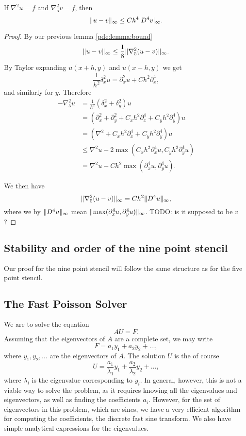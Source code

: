 \begin{theorem}
If $\nabla^2 u = f$ and $\nabla_5^2 v = f$, then
$$
\lVert u - v \rVert_\infty \leq Ch^4 \lvert D^4 v\rvert_\infty.
$$
\end{theorem}
\begin{proof}
By our previous lemma \ref{pde:lemma:bound}
$$
\lVert u - v \rVert_\infty \leq \frac18 \lVert \nabla_5^2 (u  - v) \rVert_\infty.
$$
By Taylor expanding $u(x + h, y)$ and $u(x - h, y)$ we get
$$
\frac{1}{h^2} \delta_x^2 u = \partial_x^2 u + C h^2 \partial_x^4,
$$
and similarly for $y$.
Therefore
\begin{align*}
  - \nabla_5^2 u
  &=\frac{1}{h^2} (\delta_x^2 + \delta_y^2) u\\
  &= (\partial_x^2 + \partial_y^2 + C_x h^2 \partial_x^4 + C_y h^2 \partial_y^4) u\\
  &= (\nabla^2 + C_x h^2 \partial_x^4 + C_y h^2 \partial_y^4) u\\
  &\leq \nabla^2 u + 2 \max(C_x h^2 \partial_x^4 u, C_y h^2 \partial_y^4 u)\\
  &= \nabla^2 u + C h^2 \max(\partial_x^4 u, \partial_y^4 u).
\end{align*}

We then have
$$
\lVert \nabla_5^2 (u  - v) \rVert_\infty = C h^2 \lVert D^4 u \rVert_\infty,
$$
where we by $\lVert D^4 u \rVert_\infty$ mean $\lVert \max(\partial_x^4 u, \partial_y^4 u) \rVert_\infty$. TODO: is it supposed to be $v$?
\end{proof}


\subsection{Stability and order of the nine point stencil}
Our proof for the nine point stencil will follow the same structure as for the five point stencil.



\subsection{The Fast Poisson Solver}
We are to solve the equation
$$
A U = F.
$$
Assuming that the eigenvectors of $A$ are a complete set, we may write
$$
F = a_1 y_1 + a_2 y_2 + ...,
$$
where $y_1, y_2, \dots$ are the eigenvectors of $A$.
The solution $U$ is the of course
$$
U =
\frac{a_1}{\lambda_1} y_1
+ \frac{a_2}{\lambda_2} y_2
+ \dots,
$$
where $\lambda_i$ is the eigenvalue corresponding to $y_i$.
In general, however, this is not a viable way to solve the problem, as it requires knowing all the eigenvalues and eigenvectors, as well as finding the coefficients $a_i$.
However, for the set of eigenvectors in this problem, which are sines, we have a very efficient algorithm for computing the coefficients, the discrete fast sine transform.
We also have simple analytical expressions for the eigenvalues.

